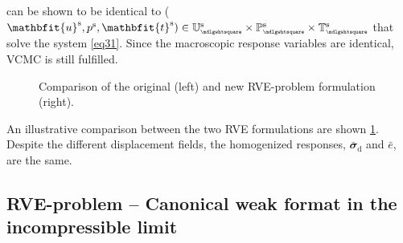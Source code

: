 \documentclass[12pt,a4paper]{article}
\renewcommand{\ta}[1]{\mathbfit{#1}}
\renewcommand{\ts}[1]{\mathbfit{#1}}
\renewcommand{\Box}{\mdlgwhtsquare}
\renewcommand{\dev}{\mathrm{d}}
\newcommand{\rve}{
  {\mathchoice
   {\mbox{\scalebox{0.67}{$\Box$}}}
   {\mbox{\scalebox{0.67}{$\Box$}}}
   {\mbox{\scalebox{0.5}{$\Box$}}}
   {\mbox{\scalebox{0.375}{$\Box$}}}
  }
}
\begin{document}
can be shown to be identical to ($\ta{u}^\fluct,p^\fluct,\ta{t}^\fluct)\in\set{U}_\rve^\fluct\times\set{P}_\rve^\fluct\times\set{T}_\rve^\fluct$ that solve the system \cref{eq31}.
Since the macroscopic response variables are identical, VCMC is still fulfilled.

\begin{figure}[!htpb]
 \centering
 
 \caption{Comparison of the original (left) and new RVE-problem formulation (right).}\label{fig:format_comparison}
\end{figure}
An illustrative comparison between the two RVE formulations are shown \cref{fig:format_comparison}.
Despite the different displacement fields, the homogenized responses, $\bar{\ts\sigma}_\dev$ and $\bar{e}$, are the same.

\subsection{RVE-problem -- Canonical weak format in the incompressible limit}
\end{document}
